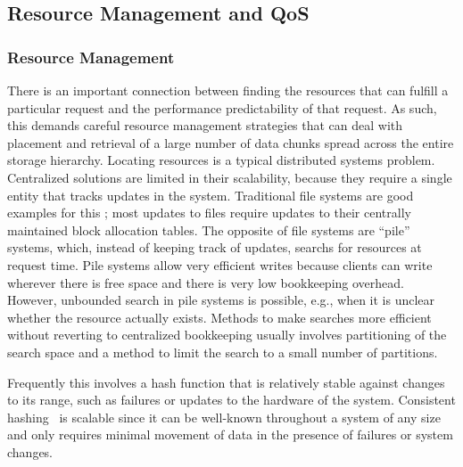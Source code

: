 \subsection{Resource Management and QoS}
\label{sec:qos}

\subsubsection{Resource Management}
There is an important connection between finding the resources
that can fulfill a particular request and the performance predictability of that request. As such, this demands
careful resource management strategies that can deal with placement and retrieval of 
a large number of data chunks spread across the entire storage hierarchy. 
Locating resources is a typical distributed systems problem. Centralized solutions are limited in their
scalability, because they require a single entity that tracks updates in the system. 
Traditional file systems are good examples for this ; most updates to files require updates 
to their centrally maintained block allocation tables. 
The opposite of file systems are ``pile'' systems, which, instead of keeping track of updates, searchs for 
resources at request time. Pile systems allow very efficient writes because clients can write wherever
there is free space and there is very low bookkeeping overhead. However, unbounded search in pile systems
is possible, e.g., when it is unclear whether the resource actually exists. 
Methods to make searches more efficient without reverting to centralized bookkeeping usually involves 
partitioning of the search space and a method to limit the search to a small number of partitions. 

Frequently this involves a hash function that is relatively stable against changes to its range, 
such as failures or updates to the hardware of the system. Consistent hashing~\cite{karger:stoc97}
is scalable since it can be well-known throughout a system of any size and only requires minimal 
movement of data in the presence of failures or system changes. 

